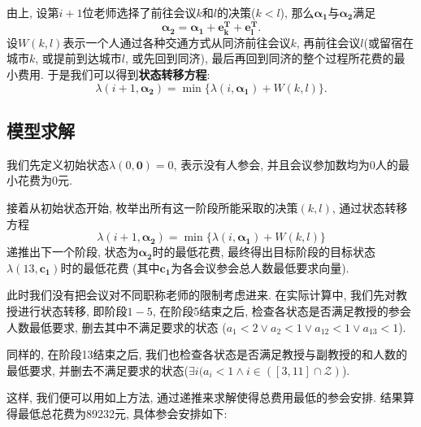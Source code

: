     由上, 设第$i+1$位老师选择了前往会议$k$和$l$的决策($k<l$),
    那么$\boldsymbol{\alpha_{1}}$与$\boldsymbol{\alpha_{2}}$满足
    \[\boldsymbol{\alpha_{2}}=\boldsymbol{\alpha_{1}}+\boldsymbol{e_{k}^T}+\boldsymbol{e_{l}^T}.\]
    设$W(k,l)$表示一个人通过各种交通方式从同济前往会议$k$,
    再前往会议$l$(或留宿在城市$k$, 或提前到达城市$l$, 或先回到同济),
    最后再回到同济的整个过程所花费的最小费用.
    于是我们可以得到\textbf{状态转移方程}:
    \[\lambda(i+1, \boldsymbol{\alpha_{2}})=\min\{\lambda(i, \boldsymbol{\alpha_{1}})+W(k,l)\}.\]
    
\subsection{模型求解}
    我们先定义初始状态$\lambda(0, \boldsymbol{0})=0$,
    表示没有人参会, 并且会议参加数均为0人的最小花费为0元.
    
    接着从初始状态开始, 枚举出所有这一阶段所能采取的决策$(k,l)$,
    通过状态转移方程
    \[\lambda(i+1, \boldsymbol{\alpha_{2}})=\min\{\lambda(i, \boldsymbol{\alpha_{1}})+W(k,l)\}\]
    递推出下一个阶段, 状态为$\boldsymbol{\alpha_{2}}$时的最低花费,
    最终得出目标阶段的目标状态$\lambda(13, \boldsymbol{c_{1}})$时的最低花费
    (其中$\boldsymbol{c_{1}}$为各会议参会总人数最低要求向量).
    
    此时我们没有把会议对不同职称老师的限制考虑进来.
    在实际计算中, 我们先对教授进行状态转移, 即阶段$1-5$, 在阶段5结束之后,
    检查各状态是否满足教授的参会人数最低要求, 删去其中不满足要求的状态
    ($a_{1}<2\vee a_{2}<1\vee a_{12}<1\vee a_{13}<1$).
    
    同样的, 在阶段13结束之后, 我们也检查各状态是否满足教授与副教授的和人数的最低要求,
    并删去不满足要求的状态($\exists i(a_{i}<1\wedge i\in ([3, 11]\cap \mathcal{Z})$).
    
    这样, 我们便可以用如上方法, 通过递推来求解使得总费用最低的参会安排.
    结果算得最低总花费为89232元, 具体参会安排如下:
    
